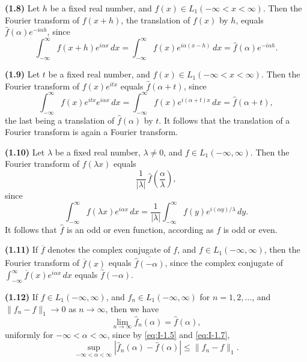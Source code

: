 \noindent\textbf{(1.8)} Let $h$ be a fixed real number, and $f(x)\in L_1(-\infty<x<\infty)$. Then the Fourier transform of $f(x+h)$, the translation of $f(x)$ by $h$, equals $\hat f(\alpha)e^{-i\alpha h}$, since
\begin{equation}\tag{1.8}\label{eq:I-1.8}
\int_{-\infty}^{\infty}f(x+h)e^{i\alpha x}\,dx
=\int_{-\infty}^{\infty}f(x)e^{i\alpha(x-h)}\,dx
=\widehat f(\alpha)e^{-i\alpha h}.
\end{equation}

\noindent\textbf{(1.9)} Let $t$ be a fixed real number, and $f(x)\in L_1(-\infty<x<\infty)$. Then the Fourier transform of $f(x)e^{itx}$ equals $\hat f(\alpha+t)$, since
\begin{equation*}\tag{1.9}\label{eq:I-1.9}
\int_{-\infty}^{\infty}f(x)e^{itx}e^{i\alpha x}\,dx
=\int_{-\infty}^{\infty}f(x)e^{i(\alpha+t)x}\,dx
=\hat f(\alpha+t),
\end{equation*}
the last being a translation of $\hat f(\alpha)$ by $t$. It follows that the translation of a Fourier transform is again a Fourier transform.

\noindent\textbf{(1.10)} Let $\lambda$ be a fixed real number, $\lambda\neq 0$, and $f\in L_1(-\infty,\infty)$. Then the Fourier transform of $f(\lambda x)$ equals
\begin{equation}\label{eq:I-1.10}
\frac{1}{|\lambda|}\,\widehat f\!\left(\frac{\alpha}{\lambda}\right),
\end{equation}
since
\begin{equation*}
\int_{-\infty}^{\infty}f(\lambda x)e^{i\alpha x}\,dx
=\frac{1}{|\lambda|}\int_{-\infty}^{\infty}f(y)e^{i(\alpha y)/\lambda}\,dy.
\end{equation*}
It follows that $\hat f$ is an odd or even function, according as $f$ is odd or even.

\noindent\textbf{(1.11)} If $\overline f$ denotes the complex conjugate of $f$, and $f\in L_1(-\infty,\infty)$, then the Fourier transform of $\overline f(x)$ equals $\overline{\hat f(-\alpha)}$, since the complex conjugate of $\int_{-\infty}^{\infty}\overline f(x)e^{i\alpha x}\,dx$ equals $\widehat f(-\alpha)$.

\noindent\textbf{(1.12)} If $f\in L_1(-\infty,\infty)$, and $f_n\in L_1(-\infty,\infty)$ for $n=1,2,\dots$, and $\|f_n-f\|_1\to 0$ as $n\to\infty$, then we have
\begin{equation}\label{eq:I-1.12}
\lim_{n\to\infty}\hat f_n(\alpha)=\hat f(\alpha),
\end{equation}
uniformly for $-\infty<\alpha<\infty$, since by \eqref{eq:I-1.5} and \eqref{eq:I-1.7},
\begin{equation*}
\sup_{-\infty<\alpha<\infty}|\hat f_n(\alpha)-\hat f(\alpha)|
\le\|f_n-f\|_1.
\end{equation*}

